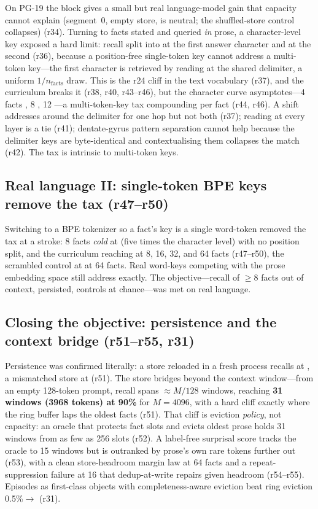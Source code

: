 On PG-19 the block gives a small but real language-model gain that capacity cannot
explain (segment~0, empty store, is neutral; the shuffled-store control collapses)
(r34). Turning to facts stated and queried \emph{in} prose, a character-level key
exposed a hard limit: recall split into  at the first answer character and
 at the second (r36), because a position-free single-token key cannot
address a multi-token key---the first character is retrieved by reading at the shared
delimiter, a uniform $1/n_{\text{facts}}$ draw. This is the r24 cliff in the text
vocabulary (r37), and the curriculum breaks it (r38, r40, r43--r46), but the
character curve asymptotes---4 facts , 8 , 12 ---a
multi-token-key tax compounding per fact (r44, r46). A shift addresses around the
delimiter for one hop but not both (r37); reading at every layer is a tie (r41);
dentate-gyrus pattern separation cannot help because the delimiter keys are
byte-identical and contextualising them collapses the match (r42). The tax is
intrinsic to multi-token keys.

\subsection{Real language II: single-token BPE keys remove the tax (r47--r50)}

Switching to a BPE tokenizer so a fact's key is a single word-token removed the tax at
a stroke: 8 facts \emph{cold} at  (five times the character level) with
no position split, and the curriculum reaching  at 8, 16, 32, and 64 facts
(r47--r50), the scrambled control at  at 64 facts. Real word-keys
competing with the prose embedding space still address exactly. The objective---recall
of $\geq 8$ facts out of context, persisted, controls at chance---was met on real
language.

\subsection{Closing the objective: persistence and the context bridge (r51--r55, r31)}

Persistence was confirmed literally: a store reloaded in a fresh process recalls at
, a mismatched store at  (r51). The store bridges beyond the
context window---from an empty 128-token prompt, recall spans $\approx M/128$ windows,
reaching \textbf{31 windows (3968 tokens) at 90\%} for $M{=}4096$, with a hard cliff
exactly where the ring buffer laps the oldest facts (r51). That cliff is eviction
\emph{policy}, not capacity: an oracle that protects fact slots and evicts oldest prose
holds 31 windows from as few as 256 slots (r52). A label-free surprisal score tracks
the oracle to 15 windows but is outranked by prose's own rare tokens further out
(r53), with a clean store-headroom margin law at 64 facts and a repeat-suppression
failure at 16 that dedup-at-write repairs given headroom (r54--r55). Episodes as
first-class objects with completeness-aware eviction beat ring eviction 0.5\%$\to$
 (r31).

